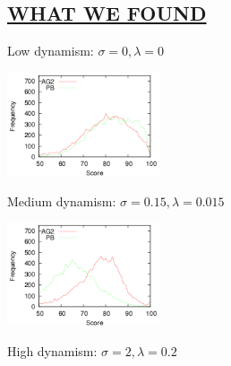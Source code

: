 \begin{kasten}
    \section*{ \hspace{0.1cm} {\color{red} \underline{WHAT WE FOUND}}}
    \vspace{-0.5em}
    \large{
      \begin{minipage}{4.5cm}
          \begin{center}
            {\small{
            Low dynamism: $\sigma=0, \lambda=0$
            
            \includegraphics[width=4.5cm]{fr-v-sc-msvl.eps}
            
            Medium dynamism: $\sigma=0.15, \lambda=0.015$
            
            \includegraphics[width=4.5cm]{fr-v-sc-msmi.eps}
            
            High dynamism: $\sigma=2, \lambda=0.2$
            
}}
\end{center}
\end{minipage}}
\end{kasten}
